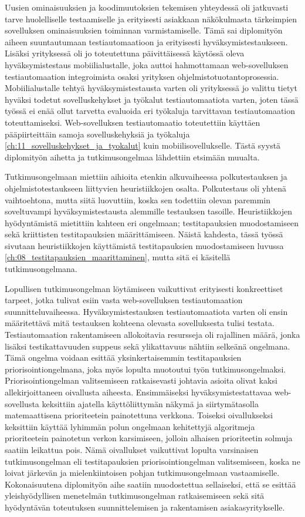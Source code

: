 Uusien ominaisuuksien ja koodimuutoksien tekemisen yhteydessä oli jatkuvasti tarve huolelliselle testaamiselle ja erityisesti asiakkaan näkökulmasta tärkeimpien sovelluksen ominaisuuksien toiminnan varmistamiselle.
Tämä sai diplomityön aiheen suuntautumaan testiautomaatioon ja erityisesti hyväksymistestaukseen.
Lisäksi yrityksessä oli jo toteutettuna päivittäisessä käytössä oleva hyväksymistestaus mobiilialustalle, joka auttoi hahmottamaan web-sovelluksen testiautomaation integroimista osaksi yrityksen ohjelmistotuotantoprosessia.
Mobiilialustalle tehtyä hyväksymistestausta varten oli yrityksessä jo valittu tietyt hyväksi todetut sovelluskehykset ja työkalut testiautomaatiota varten, joten tässä työssä ei enää ollut tarvetta evaluoida eri työkaluja tarvittavan testiautomaation toteuttamiseksi.
Web-sovelluksen testiautomaatio toteutettiin käyttäen pääpiirteittäin samoja sovelluskehyksiä ja työkaluja \ref{ch:11_sovelluskehykset_ja_tyokalut} kuin mobiilisovellukselle.
Tästä syystä diplomityön aihetta ja tutkimusongelmaa lähdettiin etsimään muualta.

Tutkimusongelmaan miettiin aihioita etenkin alkuvaiheessa polkutestauksen ja ohjelmistotestaukseen liittyvien heuristiikkojen osalta.
Polkutestaus oli yhtenä vaihtoehtona, mutta siitä luovuttiin, koska sen todettiin olevan paremmin soveltuvampi hyväksymistestausta alemmille testauksen tasoille.
Heuristiikkojen hyödyntämistä mietittiin kahteen eri ongelmaan; testitapauksien muodostamiseen sekä kriittisten testitapauksien määrittämiseen.
Näistä kahdesta, tässä työssä sivutaan heuristiikkojen käyttämistä testitapauksien muodostamiseen luvussa \ref{ch:08_testitapauksien_maarittaminen}, mutta sitä ei käsitellä tutkimusongelmana.

Lopullisen tutkimusongelman löytämiseen vaikuttivat erityisesti konkreettiset tarpeet, jotka tulivat esiin vasta web-sovelluksen testiautomaation suunnitteluvaiheessa.
Hyväksymistestauksen testiautomaatiota varten oli ensin määritettävä mitä testauksen kohteena olevasta sovelluksesta tulisi testata.
Testiautomaation rakentamiseen allokoitavia resursseja oli rajallinen määrä, jonka lisäksi testikattavuuden suppeus sekä ylikattavuus nähtiin selkeänä ongelmana.
Tämä ongelma voidaan esittää yksinkertaisemmin testitapauksien priorisointiongelmana, joka myös lopulta muotoutui työn tutkimusongelmaksi.
Priorisointiongelman valitsemiseen ratkaisevasti johtavia asioita olivat kaksi allekirjoittaneen oivallusta aiheesta.
Ensimmäiseksi hyväksymistestattavaa web-sovellusta keksittiin ajatella käyttöliittymän näkymä ja siirtymätasolla matemaattisena prioriteetein painotettuna verkkona.
Toiseksi oivallukseksi keksittiin käyttää lyhimmän polun ongelmaan kehitettyjä algoritmeja prioriteetein painotetun verkon karsimiseen, jolloin alhaisen prioriteetin solmuja saatiin leikattua pois.
Nämä oivallukset vaikuttivat lopulta varsinaisen tutkimusongelman eli testitapauksien priorisointiongelman valitsemiseen, koska ne loivat järkevän ja mielenkiintoisen pohjan tutkimusongelmaan vastaamiselle.
Kokonaisuutena diplomityön aihe saatiin muodostettua sellaiseksi, että se esittää yleishyödyllisen menetelmän tutkimusongelman ratkaisemiseen sekä sitä hyödyntävän toteutuksen suunnittelemisen ja rakentamisen asiakasyritykselle.

